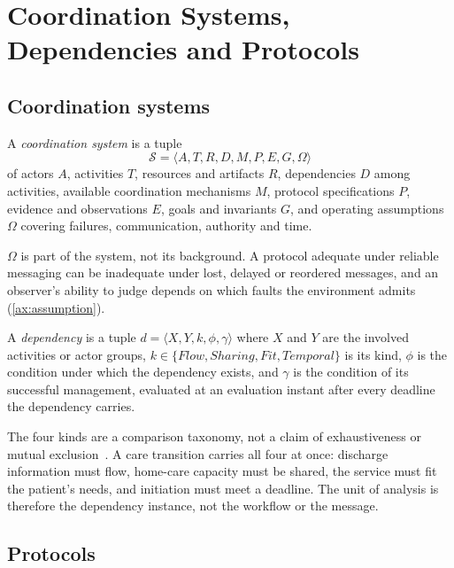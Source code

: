 \section{Coordination Systems, Dependencies and Protocols}
\label{sec:systems}

\subsection{Coordination systems}

\begin{definition}
\label{def:system}
A \emph{coordination system} is a tuple
\[
\mathcal{S} = \langle A, T, R, D, M, P, E, G, \Omega \rangle
\]
of actors $A$, activities $T$, resources and artifacts $R$, dependencies $D$ among activities, available coordination mechanisms $M$, protocol specifications $P$, evidence and observations $E$, goals and invariants $G$, and operating assumptions $\Omega$ covering failures, communication, authority and time.
\end{definition}

$\Omega$ is part of the system, not its background. A protocol adequate under reliable messaging can be inadequate under lost, delayed or reordered messages, and an observer's ability to judge depends on which faults the environment admits (\cref{ax:assumption}).

\begin{definition}[Dependency]
\label{def:dependency}
A \emph{dependency} is a tuple $d = \langle X, Y, k, \phi, \gamma \rangle$ where $X$ and $Y$ are the involved activities or actor groups, $k \in \{\mathit{Flow}, \mathit{Sharing}, \mathit{Fit}, \mathit{Temporal}\}$ is its kind, $\phi$ is the condition under which the dependency exists, and $\gamma$ is the condition of its successful management, evaluated at an evaluation instant after every deadline the dependency carries.
\end{definition}

The four kinds are a comparison taxonomy, not a claim of exhaustiveness or mutual exclusion~\cite{malone1994interdisciplinary}. A care transition carries all four at once: discharge information must flow, home-care capacity must be shared, the service must fit the patient's needs, and initiation must meet a deadline. The unit of analysis is therefore the dependency instance, not the workflow or the message.

\subsection{Protocols}

